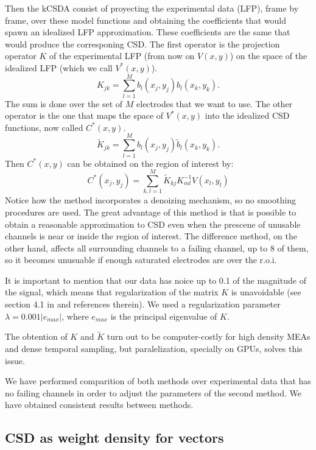 \documentclass{article}
\begin{document}
Then the kCSDA consist of proyecting the experimental data (LFP), frame by frame,
over these model functions and obtaining the  coefficients that would spawn an idealized
LFP approximation. These coefficients are the same that would produce the
corresponing CSD. The first operator is the projection operator $K$ of the experimental
LFP (from now on $V(x,y)$) on the space of the idealized LFP (which we call $V^* (x,y)$).
\begin{equation}
  K_{jk}=\sum_{l=1}^{M}b_l(x_j,y_j)b_l(x_k,y_k).
\end{equation}
The sum is done over the set of $M$ electrodes that we want to use.
The other operator is the one that maps the space of $V^*(x,y)$ into the idealized
CSD functions, now called $C^*(x,y)$. 
\begin{equation}
  \tilde{K}_{jk}=\sum_{l=1}^Mb_l(x_j,y_j)\tilde{b}_l(x_k,y_k).
\end{equation}
Then $C^*(x,y)$ can be obtained on the region of interest by:
\begin{equation}
  C^*(x_j,y_j)=\sum_{k,l=1}^M \tilde{K}_{kj} K^{-1}_{ml} V(x_l,y_l)
\end{equation}
Notice how the method incorporates a denoizing mechanism, so
no smoothing procedures are used.
The great advantage of this method is that is possible to obtain a reasonable
approximation to CSD even when the prescene of unusable channels is near or inside
the region of interest. The difference method, on the other hand, affects all surrounding
channels to a failing channel, up to 8 of them, so it becomes unusuable if enough
saturated electrodes are over the r.o.i.

It is important to mention that our data has noice up to 0.1 of the magnitude of the
signal, which means that regularization of the matrix $K$ is unavoidable (see section 4.1 in \cite{Potworowski2011} and references therein). We used a regularization parameter $\lambda=0.001 |e_{max}|$, where $e_{max}$ is the principal eigenvalue of $K$. 

The obtention of $K$ and $\tilde{K}$ turn out to be computer-costly for high density MEAs and dense temporal sampling, but paralelization, specially on
GPUs, solves this issue.

We have performed comparition of both methods over experimental data that has
no failing channels in order to adjust the parameters of the second method. We
have obtained consistent results between methods.


\subsection{CSD as weight density for vectors}
\end{document}
